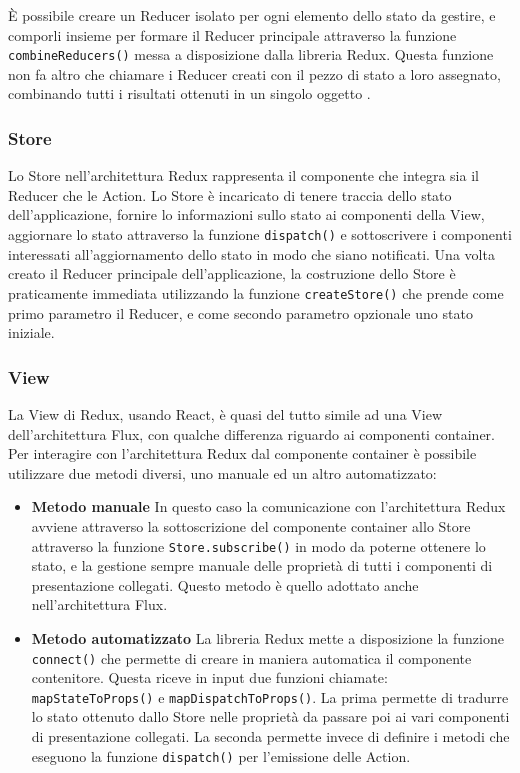 \noindent
È possibile creare un Reducer isolato per ogni elemento dello stato da gestire, e comporli insieme per formare il Reducer principale attraverso la funzione \texttt{combineReducers()} messa a disposizione dalla libreria Redux. Questa funzione non fa altro che chiamare i Reducer creati con il pezzo di stato a loro assegnato, combinando tutti i risultati ottenuti in un singolo oggetto \cite{ReduxDocumentation}.

\subsubsection*{Store}
Lo Store nell'architettura Redux rappresenta il componente che integra sia il Reducer che le Action. Lo Store è incaricato di tenere traccia dello stato dell'applicazione, fornire lo informazioni sullo stato ai componenti della View, aggiornare lo stato attraverso la funzione \texttt{dispatch()} e sottoscrivere i componenti interessati all'aggiornamento dello stato in modo che siano notificati.
Una volta creato il Reducer principale dell'applicazione, la costruzione dello Store è praticamente immediata utilizzando la funzione \texttt{createStore()} che prende come primo parametro il Reducer, e come secondo parametro opzionale uno stato iniziale.

\subsubsection*{View}
La View di Redux, usando React, è quasi del tutto simile ad una View dell'architettura Flux, con qualche differenza riguardo ai componenti container. Per interagire con l'architettura Redux dal componente container è possibile utilizzare due metodi diversi, uno manuale ed un altro automatizzato:

\begin{itemize}
    \item \textbf{Metodo manuale} In questo caso la comunicazione con l'architettura Redux avviene attraverso la sottoscrizione del componente container allo Store attraverso la funzione \texttt{Store.subscribe()} in modo da poterne ottenere lo stato, e la gestione sempre manuale delle proprietà di tutti i componenti di presentazione collegati. Questo metodo è quello adottato anche nell'architettura Flux.

    \item \textbf{Metodo automatizzato} La libreria Redux mette a disposizione la funzione \texttt{connect()} che permette di creare in maniera automatica il componente contenitore. Questa riceve in input due funzioni chiamate: \texttt{mapStateToProps()} e \texttt{mapDispatchToProps()}. La prima permette di tradurre lo stato ottenuto dallo Store nelle proprietà da passare poi ai vari componenti di presentazione collegati. La seconda permette invece di definire i metodi che eseguono la funzione \texttt{dispatch()} per l'emissione delle Action.
\end{itemize}

